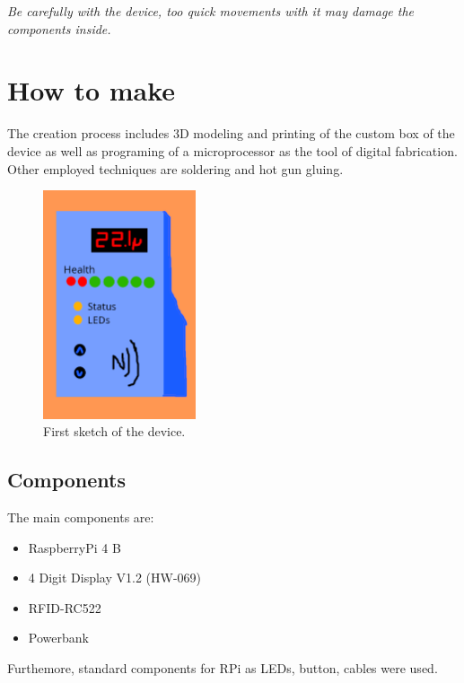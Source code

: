 \documentclass{article}
\begin{document}
\emph{Be carefully with the device, too quick movements with it may damage the components inside.}

\section{How to make}
    The creation process includes 3D modeling and printing of the custom box of the device as well as programing of a microprocessor as the tool of digital fabrication.
    Other employed techniques are soldering and hot gun gluing.

\begin{figure}
    \centering
    \includegraphics[width=0.4\textwidth]{imgs/Sketch.png}
    \caption{First sketch of the device.}
\end{figure}

\subsection{Components}
The main components are:
\begin{itemize}
    \item RaspberryPi 4 B
    \item 4 Digit Display V1.2 (HW-069) 
    \item RFID-RC522
    \item Powerbank
\end{itemize}
Furthemore, standard components for RPi as LEDs, button, cables were used.
\end{document}
